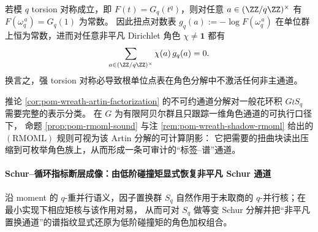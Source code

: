 \begin{remark}[角色侧的可观测必要条件：torsion 对称 \texorpdfstring{$\Rightarrow$}{=>} 非主角色系数全消失]\label{rem:pom-torsion-symmetry-implies-no-nonprincipal-character}
若模 \(q\) torsion 对称成立，即 \(F(t)=G_q(t^q)\)，则对任意 \(a\in(\ZZ/q\ZZ)^\times\) 有
\(
F(\omega_q^{\,a})=G_q(1)
\)
为常数。
因此扭点对数表 \(g_q(a):=-\log F(\omega_q^{\,a})\) 在单位群上恒为常数，进而对任意非平凡 Dirichlet 角色 \(\chi\neq\mathbf 1\) 都有
\[
\sum_{a\in(\ZZ/q\ZZ)^\times}\chi(a)\,g_q(a)=0.
\]
换言之，强 torsion 对称必导致根单位点表在角色分解中不激活任何非主通道。
\end{remark}

\begin{remark}\label{rem:pom-wreath-artin-computable-shadow}
推论 \ref{cor:pom-wreath-artin-factorization} 的不可约通道分解对一般花环积 \(G\wr S_q\) 需要完整的表示分类。
在 \(G\) 为有限阿贝尔群且只跟踪一维角色通道的可执行口径下，
命题 \ref{prop:pom-rmoml-sound} 与注 \ref{rem:pom-wreath-shadow-rmoml} 给出的 \((\mathrm{RMOML})\) 规则可视为该 Artin 分解的可计算阴影：
它把需要的扭曲块读出压缩到可枚举角色族上，从而形成一条可审计的“标签--谱”通道。
\end{remark}

\paragraph{Schur--循环指标断层成像：由低阶碰撞矩显式恢复非平凡 Schur 通道}
沿 moment 的 \(q\)-重并行语义，因子置换群 \(S_q\) 自然作用于未取商的 \(q\)-并行核；在最小实现下相应矩核与该作用对易，
从而可对 \(S_q\) 做等变 Schur 分解并把“非平凡置换通道”的谱指纹显式还原为低阶碰撞矩的角色加权组合。

